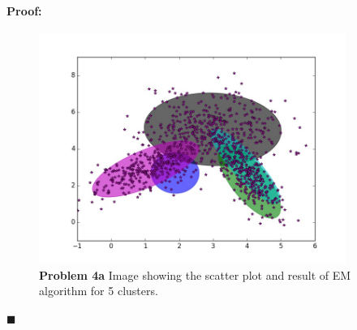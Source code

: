\documentclass[12pt]{article}
\newenvironment{proof}{\paragraph{Proof: }}{\hfill$\blacksquare$}
\begin{document}
\begin{proof}
\begin{enumerate}
\begin{figure}[!htbp]
\centering
\includegraphics[width = 10cm]{prob4a_k5.jpg}
\caption{\textbf{Problem 4a} Image showing the scatter plot and result of EM algorithm for 5 clusters.}
\end{figure}


\end{enumerate}
\end{proof}
\end{document}

